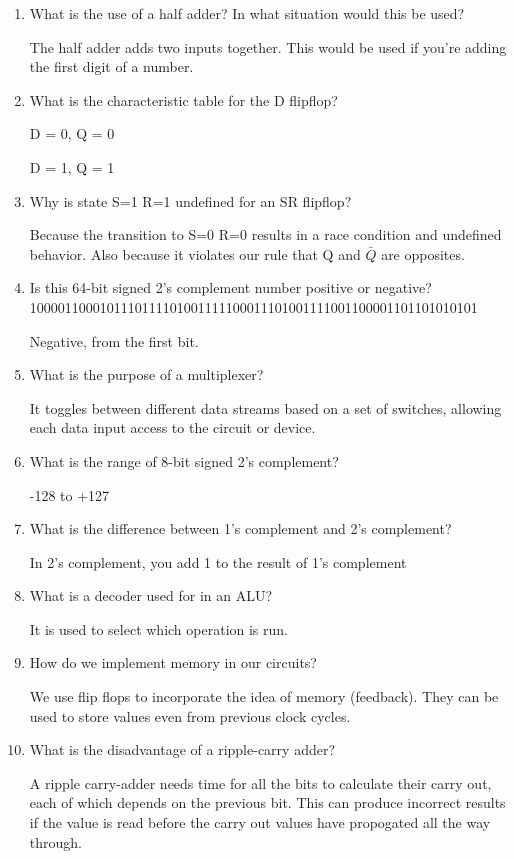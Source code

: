 \documentclass[10pt]{article}
\begin{document}
\begin{itemize}
\begin{enumerate}
\item What is the use of a half adder?  In what situation would this be used?

The half adder adds two inputs together.  This would be used if you're adding the first digit of a number.

\item What is the characteristic table for the D flipflop?

D = 0, Q = 0

D = 1, Q = 1

\item Why is state S=1 R=1 undefined for an SR flipflop?

Because the transition to S=0 R=0 results in a race condition and undefined behavior.  Also because it violates our rule that Q and $\bar{Q}$ are opposites.

\item Is this 64-bit signed 2's complement number positive or negative? \\
1000011000101110111101001111100011101001111001100001101101010101

Negative, from the first bit.

\item What is the purpose of a multiplexer?

It toggles between different data streams based on a set of switches, allowing each data input access to the circuit or device.

\item What is the range of 8-bit signed 2's complement?

-128 to +127

\item What is the difference between 1's complement and 2's complement?

In 2's complement, you add 1 to the result of 1's complement

\item What is a decoder used for in an ALU?

It is used to select which operation is run.

\item How do we implement memory in our circuits?

We use flip flops to incorporate the idea of memory (feedback).  They can be used to store values even from previous clock cycles.

\item What is the disadvantage of a ripple-carry adder?

A ripple carry-adder needs time for all the bits to calculate their carry out, each of which depends on the previous bit.  This can produce incorrect results if the value is read before the carry out values have propogated all the way through.

\end{enumerate}

\end{itemize}
\end{document}
